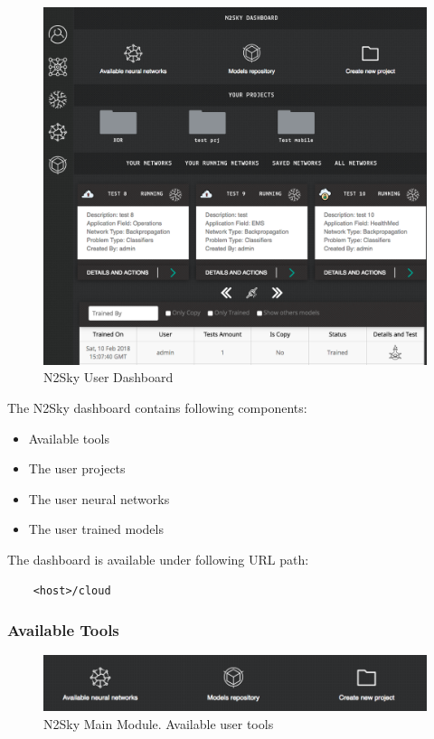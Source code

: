\begin{figure}[H]
\begin{center}
  \includegraphics[width=\linewidth]{components/5/img/n2sky_main_dashboard.png}
  \caption{N2Sky User Dashboard}
  \label{fig:n2skymaindashboard}
\end{center}
\end{figure}

The N2Sky dashboard contains following components:
\begin{itemize}
\item Available tools
\item The user projects
\item The user neural networks 
\item The user trained models
\end{itemize}

The dashboard is available under following URL path:
 \begin{lstlisting}
    <host>/cloud
\end{lstlisting}

\subsubsection{Available Tools}

\begin{figure}[htbp]
\begin{center}
  \includegraphics[scale=0.5]{components/5/img/n2sky_tools.png}
  \caption{N2Sky Main Module. Available user tools}
  \label{fig:n2sky_tools}
\end{center}
\end{figure}

